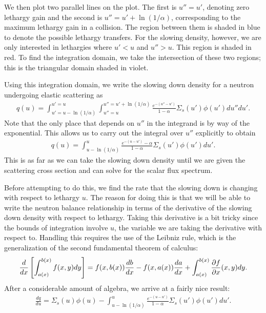We then plot two parallel lines on the plot. The first is $u'' = u'$, denoting zero lethargy gain and the second is $u'' = u' + \ln(1/\alpha)$, corresponding to the maximum lethargy gain in a collision. The region between them is shaded in blue to denote the possible lethargy transfers. For the slowing density, however, we are only interested in lethargies where $u' < u$ and $u'' > u$. This region is shaded in red. To find the integration domain, we take the intersection of these two regions; this is the triangular domain shaded in violet.

Using this integration domain, we write the slowing down density for a neutron undergoing elastic scattering as
\begin{align}
  q(u) = \int_{u'=u-\ln(1/\alpha)}^{u'=u} \int_{u''=u}^{u''=u'+\ln(1/\alpha)} \frac{e^{-(u''-u')}}{1 - \alpha} \Sigma_s(u') \phi(u') du'' du' .
\end{align}
Note that the only place that depends on $u''$ in the integrand is by way of the exponential. This allows us to carry out the integral over $u''$ explicitly to obtain
\begin{align}
  q(u) = \int_{u-\ln(1/\alpha)}^{u} \frac{e^{-(u-u')} - \alpha}{1 - \alpha} \Sigma_s(u') \phi(u') du' . \label{Eq:thermalization_slowingDownDensitySimplifed}
\end{align}
This is as far as we can take the slowing down density until we are given the scattering cross section and can solve for the scalar flux spectrum.

Before attempting to do this, we find the rate that the slowing down is changing with respect to lethargy $u$. The reason for doing this is that we will be able to write the neutron balance relationship in terms of the derivative of the slowing down density with respect to lethargy. Taking this derivative is a bit tricky since the bounds of integration involve $u$, the variable we are taking the derivative with respect to. Handling this requires the use of the Leibniz rule, which is the generalization of the second fundamental theorem of calculus:
\begin{align}
  \frac{d}{dx} \left[ \int_{a(x)}^{b(x)} f(x,y) dy \right] = f(x,b(x)) \frac{db}{dx}  - f(x,a(x)) \frac{da}{dx} + \int_{a(x)}^{b(x)} \frac{ \partial {f} }{ \partial {x} }(x,y) dy .
\end{align}
After a considerable amount of algebra, we arrive at a fairly nice result:
\begin{align}
  \frac{dq}{du} = \Sigma_s(u) \phi(u) -  \int_{u-\ln(1/\alpha)}^{u} \frac{e^{-(u-u')}}{1 - \alpha} \Sigma_s(u') \phi(u') du' . \label{Eq:thermalization_slowingDownDensityDerivative}
\end{align}

